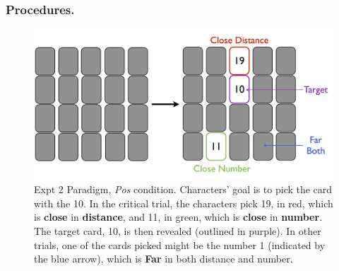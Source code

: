 \documentclass[10pt,letterpaper]{article}
\newcommand{\red}[1]{\textcolor{Red}{#1}}
\begin{document}
\subsubsection{Procedures.} 

\begin{figure}[htb!]
\includegraphics[width=\columnwidth]{images/card_paradigm.png}
\caption{ Expt 2 Paradigm, \textit{Pos} condition. Characters' goal is to pick the card with the 10. In the critical trial, the characters pick 19, in red, which is \textbf{close} in \textbf{distance}, and 11, in green, which is \textbf{close} in \textbf{number}. The target card, 10, is then revealed (outlined in purple). In other trials, one of the cards picked might be the number 1 (indicated by the blue arrow), which is \textbf{Far} in both distance and number. }
\label{Expt2ParadigmFig}
\end{figure}

\end{document}
